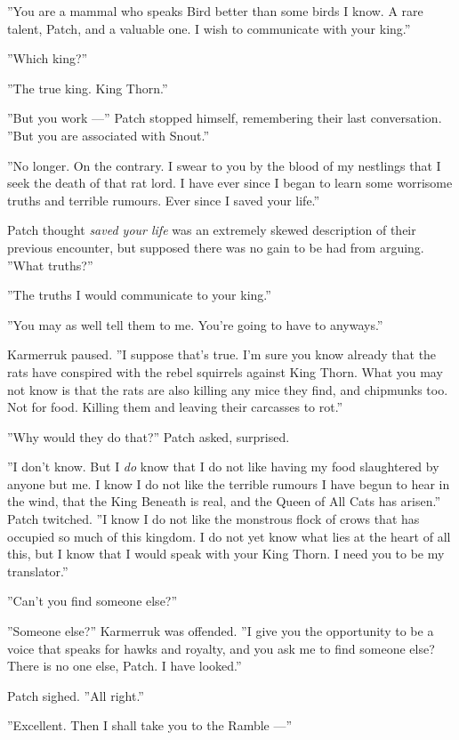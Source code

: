 \documentclass[12pt]{book}
\begin{document}
''You are a mammal who speaks Bird better than some birds I know. A
rare talent, Patch, and a valuable one. I wish to communicate with
your king.''

''Which king?''

''The true king. King Thorn.''

''But you work ---'' Patch stopped himself, remembering their last
conversation. ''But you are associated with Snout.''

''No longer. On the contrary. I swear to you by the blood of my
nestlings that I seek the death of that rat lord. I have ever since I
began to learn some worrisome truths and terrible rumours. Ever since
I saved your life.''

Patch thought \textit{saved your life} was an extremely skewed
description of their previous encounter, but supposed there was no
gain to be had from arguing. ''What truths?''

''The truths I would communicate to your king.''

''You may as well tell them to me. You're going to have to anyways.''

Karmerruk paused. ''I suppose that's true. I'm sure you know already
that the rats have conspired with the rebel squirrels against King
Thorn. What you may not know is that the rats are also killing any
mice they find, and chipmunks too. Not for food. Killing them and
leaving their carcasses to rot.''

''Why would they do that?'' Patch asked, surprised.

''I don't know. But I \textit{do} know that I do not like having my
food slaughtered by anyone but me. I know I do not like the terrible
rumours I have begun to hear in the wind, that the King Beneath is
real, and the Queen of All Cats has arisen.'' Patch twitched. ''I know
I do not like the monstrous flock of crows that has occupied so much
of this kingdom. I do not yet know what lies at the heart of all this,
but I know that I would speak with your King Thorn. I need you to be
my translator.''

''Can't you find someone else?''

''Someone else?'' Karmerruk was offended. ''I give you the opportunity
to be a voice that speaks for hawks and royalty, and you ask me to
find someone else? There is no one else, Patch. I have looked.''

Patch sighed. ''All right.''

''Excellent. Then I shall take you to the Ramble ---''
\end{document}
